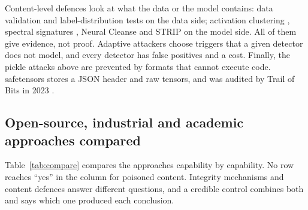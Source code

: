 Content-level defences look at what the data or the model contains: data validation and label-distribution
tests on the data side; activation clustering \cite{activation}, spectral signatures \cite{spectral}, Neural
Cleanse \cite{neuralcleanse} and STRIP \cite{strip} on the model side. All of them give evidence, not proof.
Adaptive attackers choose triggers that a given detector does not model, and every detector has false positives
and a cost. Finally, the pickle attacks above are prevented by formats that cannot execute code. safetensors
stores a JSON header and raw tensors, and was audited by Trail of Bits in 2023 \cite{safetensors}.

\subsection{Open-source, industrial and academic approaches compared}
Table~\ref{tab:compare} compares the approaches capability by capability. No row reaches ``yes'' in the column
for poisoned content. Integrity mechanisms and content defences answer different questions, and a credible
control combines both and says which one produced each conclusion.

